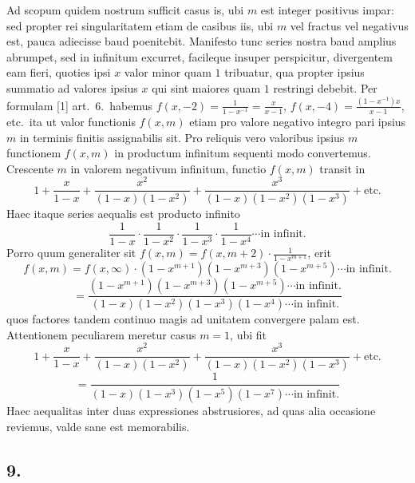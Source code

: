 \documentclass[12pt,a4paper]{article}
\theoremstyle{plain}
\begin{document}
Ad scopum quidem nostrum sufficit casus is, ubi $m$ est integer positivus impar: sed propter rei singularitatem etiam de casibus iis, ubi $m$ vel fractus vel negativus est, pauca adiecisse baud poenitebit. Manifesto tunc series nostra baud amplius abrumpet, sed in infinitum excurret, facileque insuper perspicitur, divergentem eam fieri, quoties ipsi $x$ valor minor quam $1$ tribuatur, qua propter ipsius summatio ad valores ipsius $x$ qui sint maiores quam $1$ restringi debebit. Per formulam [1] art.\ 6.\ habemus $f(x, -2) = \frac{1}{1-x^{-1}} = \frac{x}{x-1}$, $f(x, -4) = \frac{(1-x^{-1})x}{x-1}$, etc.\ ita ut valor functionis $f(x, m)$ etiam pro valore negativo integro pari ipsius $m$ in terminis finitis assignabilis sit. Pro reliquis vero valoribus ipsius $m$ functionem $f(x, m)$ in productum infinitum sequenti modo convertemus. Crescente $m$ in valorem negativum infinitum, functio $f(x, m)$ transit in
\[
1 + \frac{x}{1-x} + \frac{x^2}{(1-x)(1-x^2)} + \frac{x^3}{(1-x)(1-x^2)(1-x^3)} + \text{etc.}
\]
Haec itaque series aequalis est producto infinito
\[
\frac{1}{1-x} \cdot \frac{1}{1-x^2} \cdot \frac{1}{1-x^3} \cdot \frac{1}{1-x^4} \cdots \text{in infinit.}
\]
Porro quum generaliter sit $f(x, m) = f(x, m+2) \cdot \frac{1}{1-x^{m+1}}$, erit
\[
f(x, m) = f(x, \infty) \cdot (1-x^{m+1})(1-x^{m+3})(1-x^{m+5}) \cdots \text{in infinit.}
\]
\[
= \frac{(1-x^{m+1})(1-x^{m+3})(1-x^{m+5}) \cdots \text{in infinit.}}{(1-x)(1-x^2)(1-x^3)(1-x^4) \cdots \text{in infinit.}}
\]
quos factores tandem continuo magis ad unitatem convergere palam est. Attentionem peculiarem meretur casus $m = 1$, ubi fit
\[
1 + \frac{x}{1-x} + \frac{x^2}{(1-x)(1-x^2)} + \frac{x^3}{(1-x)(1-x^2)(1-x^3)} + \text{etc.}
\]
\[
= \frac{1}{(1-x)(1-x^3)(1-x^5)(1-x^7) \cdots \text{in infinit.}}
\]
Haec aequalitas inter duas expressiones abstrusiores, ad quas alia occasione reviemus, valde sane est memorabilis.

\subsection*{9.}
\end{document}
